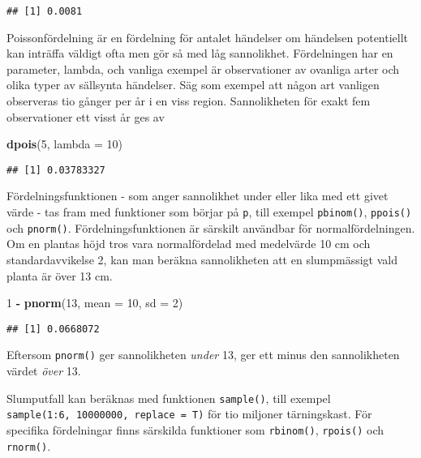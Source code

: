 \documentclass[
]{book}
\newenvironment{Shaded}{\begin{snugshade}}{\end{snugshade}}
\newcommand{\AttributeTok}[1]{\textcolor[rgb]{0.13,0.29,0.53}{#1}}
\newcommand{\DecValTok}[1]{\textcolor[rgb]{0.00,0.00,0.81}{#1}}
\newcommand{\FunctionTok}[1]{\textcolor[rgb]{0.13,0.29,0.53}{\textbf{#1}}}
\newcommand{\NormalTok}[1]{#1}
\newcommand{\SpecialCharTok}[1]{\textcolor[rgb]{0.81,0.36,0.00}{\textbf{#1}}}
\theoremstyle{definition}
\theoremstyle{definition}
\theoremstyle{definition}
\theoremstyle{definition}
\theoremstyle{remark}
\begin{document}
\begin{verbatim}
## [1] 0.0081
\end{verbatim}

Poissonfördelning är en fördelning för antalet händelser om händelsen potentiellt kan inträffa väldigt ofta men gör så med låg sannolikhet. Fördelningen har en parameter, lambda, och vanliga exempel är observationer av ovanliga arter och olika typer av sällsynta händelser. Säg som exempel att någon art vanligen observeras tio gånger per år i en viss region. Sannolikheten för exakt fem observationer ett visst år ges av

\begin{Shaded}
\begin{Highlighting}[]
\FunctionTok{dpois}\NormalTok{(}\DecValTok{5}\NormalTok{, }\AttributeTok{lambda =} \DecValTok{10}\NormalTok{)}
\end{Highlighting}
\end{Shaded}

\begin{verbatim}
## [1] 0.03783327
\end{verbatim}

Fördelningsfunktionen - som anger sannolikhet under eller lika med ett givet värde - tas fram med funktioner som börjar på \texttt{p}, till exempel \texttt{pbinom()}, \texttt{ppois()} och \texttt{pnorm()}. Fördelningsfunktionen är särskilt användbar för normalfördelningen. Om en plantas höjd tros vara normalfördelad med medelvärde 10 cm och standardavvikelse 2, kan man beräkna sannolikheten att en slumpmässigt vald planta är över 13 cm.

\begin{Shaded}
\begin{Highlighting}[]
\DecValTok{1} \SpecialCharTok{{-}} \FunctionTok{pnorm}\NormalTok{(}\DecValTok{13}\NormalTok{, }\AttributeTok{mean =} \DecValTok{10}\NormalTok{, }\AttributeTok{sd =} \DecValTok{2}\NormalTok{)}
\end{Highlighting}
\end{Shaded}

\begin{verbatim}
## [1] 0.0668072
\end{verbatim}

Eftersom \texttt{pnorm()} ger sannolikheten \emph{under} 13, ger ett minus den sannolikheten värdet \emph{över} 13.

Slumputfall kan beräknas med funktionen \texttt{sample()}, till exempel \texttt{sample(1:6,\ 10000000,\ replace\ =\ T)} för tio miljoner tärningskast. För specifika fördelningar finns särskilda funktioner som \texttt{rbinom()}, \texttt{rpois()} och \texttt{rnorm()}.
\end{document}

